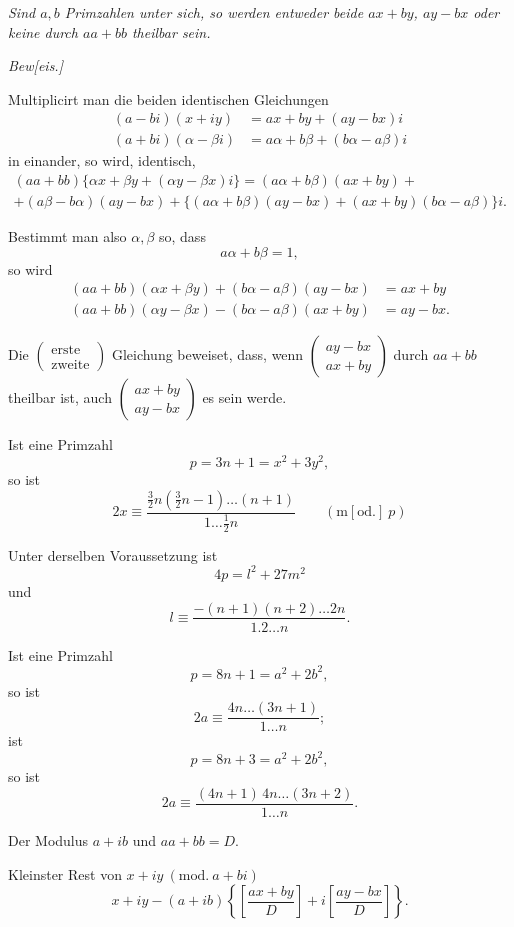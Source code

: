 \NoSourceHead
{}
\par\indent\textit{Sind $a,b$ Primzahlen unter sich, so werden entweder beide $ax+by$, $ay-bx$ oder keine durch $aa+bb$ theilbar sein.}

\textit{Bew[eis.]}

Multiplicirt man die beiden identischen Gleichungen
\[
\begin{aligned}
(a-bi)(x+iy)&=ax+by+(ay-bx)i\\
(a+bi)(\alpha-\beta i)&=a\alpha+b\beta+(b\alpha-a\beta)i
\end{aligned}
\]
\noindent in einander, so wird, identisch,
\[
\begin{gathered}
(aa+bb)\{\alpha x+\beta y+(\alpha y-\beta x)i\}=(a\alpha+b\beta)(ax+by)+\\
+(a\beta-b\alpha)(ay-bx)+\{(a\alpha+b\beta)(ay-bx)+(ax+by)(b\alpha-a\beta)\}i.
\end{gathered}
\]
\par\indent Bestimmt man also $\alpha,\beta$ so, dass
\[
a\alpha+b\beta=1,
\]
\noindent so wird
\[
\begin{aligned}
(aa+bb)(\alpha x+\beta y)+(b\alpha-a\beta)(ay-bx)&=ax+by\\
(aa+bb)(\alpha y-\beta x)-(b\alpha-a\beta)(ax+by)&=ay-bx.
\end{aligned}
\]
\par\indent Die $\begin{pmatrix}\text{erste}\\\text{zweite}\end{pmatrix}$ Gleichung beweiset, dass, wenn $\begin{pmatrix}ay-bx\\ax+by\end{pmatrix}$ durch $aa+bb$ theilbar ist, auch $\begin{pmatrix}ax+by\\ay-bx\end{pmatrix}$ es sein werde.
\clearpage

\par\indent Ist eine Primzahl
\[
p=3n+1=x^2+3y^2,
\]
\noindent so ist
\[
2x\equiv\frac{\tfrac32n(\tfrac32n-1)\ldots(n+1)}{1\ldots\tfrac12n}\qquad(\mathrm{m[od.]}\ p)
\]
\par\indent Unter derselben Voraussetzung ist
\[
4p=l^2+27m^2
\]
\noindent und
\[
l\equiv\frac{-(n+1)(n+2)\ldots2n}{1.2\ldots n}.
\]
\par\indent Ist eine Primzahl
\[
p=8n+1=a^2+2b^2,
\]
\noindent so ist
\[
2a\equiv\frac{4n\ldots(3n+1)}{1\ldots n};
\]
\noindent ist
\[
p=8n+3=a^2+2b^2,
\]
\noindent so ist
\[
2a\equiv\frac{(4n+1)\,4n\ldots(3n+2)}{1\ldots n}.
\]
\ClosingRule
{}
\par\indent Der Modulus $a+ib$ und $aa+bb=D$.

Kleinster Rest von $x+iy\ (\mathrm{mod.}\ a+bi)$
\[
x+iy-(a+ib)\left\{\left[\frac{ax+by}{D}\right]+i\left[\frac{ay-bx}{D}\right]\right\}.
\]
\clearpage

